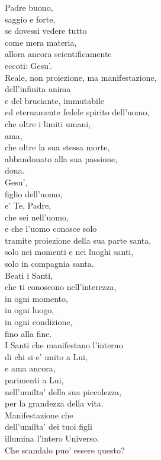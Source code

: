 \begin{haiku}
Padre buono,\\
saggio e forte,\\
se dovessi vedere tutto \\
come mera materia,\\
allora ancora scientificamente\\
eccoti: Gesu'.\\
Reale, non proiezione, ma manifestazione, \\
dell'infinita anima\\
e del bruciante, immutabile \\
ed eternamente fedele spirito dell'uomo,\\
che oltre i limiti umani,\\
ama,\\
che oltre la sua stessa morte,\\
abbandonato alla sua passione,\\
dona.\\
Gesu',\\
figlio dell'uomo,\\
e' Te, Padre,\\
che sei nell'uomo,\\
e che l'uomo conosce solo\\
tramite proiezione della sua parte santa,\\
solo nei momenti e nei luoghi santi,\\
solo in compagnia santa.\\
Beati i Santi,\\
che ti conoscono nell'interezza,\\
in ogni momento,\\
in ogni luogo,\\
in ogni condizione,\\
fino alla fine.\\
I Santi che manifestano l'interno\\
di chi si e' unito a Lui,\\
e ama ancora,\\
parimenti a Lui,\\
nell'umilta' della sua piccolezza,\\
per la grandezza della vita.\\
Manifestazione che \\
dell'umilta' dei tuoi figli\\
illumina l'intero Universo.\\
Che scandalo puo' essere questo?\\

\end{haiku}
